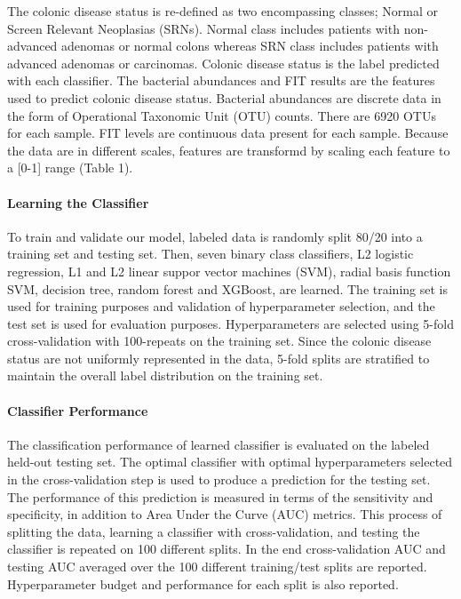 \documentclass[11pt,]{article}
\let\oldparagraph\paragraph
\renewcommand{\paragraph}[1]{\oldparagraph{#1}\mbox{}}
\begin{document}
The colonic disease status is re-defined as two encompassing classes;
Normal or Screen Relevant Neoplasias (SRNs). Normal class includes
patients with non-advanced adenomas or normal colons whereas SRN class
includes patients with advanced adenomas or carcinomas. Colonic disease
status is the label predicted with each classifier. The bacterial
abundances and FIT results are the features used to predict colonic
disease status. Bacterial abundances are discrete data in the form of
Operational Taxonomic Unit (OTU) counts. There are 6920 OTUs for each
sample. FIT levels are continuous data present for each sample. Because
the data are in different scales, features are transformd by scaling
each feature to a {[}0-1{]} range (Table 1).

\paragraph{Learning the Classifier}\label{learning-the-classifier}

To train and validate our model, labeled data is randomly split 80/20
into a training set and testing set. Then, seven binary class
classifiers, L2 logistic regression, L1 and L2 linear suppor vector
machines (SVM), radial basis function SVM, decision tree, random forest
and XGBoost, are learned. The training set is used for training purposes
and validation of hyperparameter selection, and the test set is used for
evaluation purposes. Hyperparameters are selected using 5-fold
cross-validation with 100-repeats on the training set. Since the colonic
disease status are not uniformly represented in the data, 5-fold splits
are stratified to maintain the overall label distribution on the
training set.

\paragraph{Classifier Performance}\label{classifier-performance}

The classification performance of learned classifier is evaluated on the
labeled held-out testing set. The optimal classifier with optimal
hyperparameters selected in the cross-validation step is used to produce
a prediction for the testing set. The performance of this prediction is
measured in terms of the sensitivity and specificity, in addition to
Area Under the Curve (AUC) metrics. This process of splitting the data,
learning a classifier with cross-validation, and testing the classifier
is repeated on 100 different splits. In the end cross-validation AUC and
testing AUC averaged over the 100 different training/test splits are
reported. Hyperparameter budget and performance for each split is also
reported.
\end{document}
